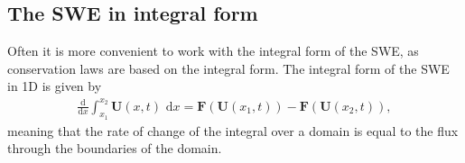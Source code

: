 \subsection{The SWE in integral form}
Often it is more convenient to work with the integral form of the SWE, as conservation laws are based on the integral form.
The integral form of the SWE in 1D is given by
\begin{align}\label{eq:integral_form_1D}
    \frac{\text{d}}{\text{d}x} \int_{x_1}^{x_2} \mathbf{U}(x,t) \text{ d}x = \mathbf{F}(\mathbf{U}(x_1, t)) - \mathbf{F}(\mathbf{U}(x_2, t)),
\end{align}
meaning that the rate of change of the integral over a domain is equal to the flux through the boundaries of the domain.


